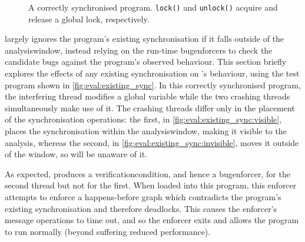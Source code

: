 \begin{figure}
{{    }
    \hspace{3mm}
    \label{fig:eval:existing_sync:invisible}
  }
  \hspace{-3mm}
  \hfill
  \hspace{-3mm}
  \vspace{-12pt}
  \caption{A correctly synchronised program.  \texttt{lock()} and
    \texttt{unlock()} acquire and release a global lock,
    respectively.}
  \label{fig:eval:existing_sync}
\end{figure}

{\Technique} largely ignores the program's existing synchronisation if
it falls outside of the \gls{analysiswindow}, instead relying on the
run-time \glspl{bugenforcer} to check the candidate bugs against the
program's observed behaviour.  This section briefly explores the
effects of any existing synchronisation on {\technique}'s behaviour,
using the test program shown in \autoref{fig:eval:existing_sync}.  In
this correctly synchronised program, the interfering thread modifies a
global variable while the two crashing threads simultaneously make use
of it.  The crashing threads differ only in the placement of the
synchronisation operations: the first, in
\autoref{fig:eval:existing_sync:visible}, places the synchronisation
within the \gls{analysiswindow}, making it visible to the {\technique}
analysis, whereas the second, in
\autoref{fig:eval:existing_sync:invisible}, moves it outside of the
window, so {\technique} will be unaware of it.

As expected, {\technique} produces a \gls{verificationcondition}, and
hence a \gls{bugenforcer}, for the second thread but not for the
first.  When loaded into this program, this enforcer attempts to
enforce a happens-before graph which contradicts the program's
existing synchronisation and therefore deadlocks.  This causes the
enforcer's message operations to time out, and so the enforcer exits
and allows the program to run normally (beyond suffering reduced
performance).

